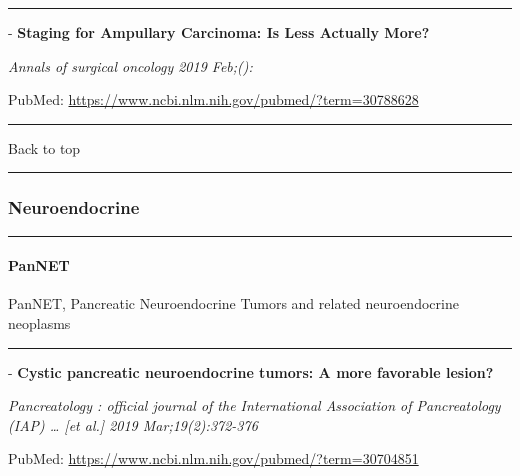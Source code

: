 \documentclass[]{article}
\let\oldparagraph\paragraph
\renewcommand{\paragraph}[1]{\oldparagraph{#1}\mbox{}}
\begin{document}
{}

{}

\begin{center}\rule{0.5\linewidth}{\linethickness}\end{center}

 - \textbf{Staging for Ampullary Carcinoma: Is Less Actually More?}

\emph{Annals of surgical oncology 2019 Feb;():}

PubMed: \url{https://www.ncbi.nlm.nih.gov/pubmed/?term=30788628}

{}

{}

\begin{center}\rule{0.5\linewidth}{\linethickness}\end{center}

Back to top

\begin{center}\rule{0.5\linewidth}{\linethickness}\end{center}

\pagebreak

\hypertarget{neuroendocrine}{%
\subsubsection{Neuroendocrine}\label{neuroendocrine}}

\begin{center}\rule{0.5\linewidth}{\linethickness}\end{center}

\hypertarget{pannet}{%
\paragraph{PanNET}\label{pannet}}

PanNET, Pancreatic Neuroendocrine Tumors and related neuroendocrine
neoplasms

\begin{center}\rule{0.5\linewidth}{\linethickness}\end{center}

 - \textbf{Cystic pancreatic neuroendocrine tumors: A more favorable
lesion?}

\emph{Pancreatology : official journal of the International Association
of Pancreatology (IAP) \ldots{} {[}et al.{]} 2019 Mar;19(2):372-376}

PubMed: \url{https://www.ncbi.nlm.nih.gov/pubmed/?term=30704851}
\end{document}
